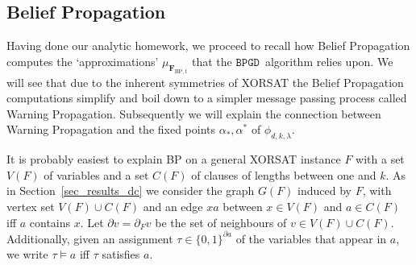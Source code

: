 \documentclass[10pt,reqno]{amsart}
\numberwithin{equation}{section}
\renewcommand{\vec}[1]{\boldsymbol{#1}}
\newcommand{\FBP}[1]{\PHI_{\mathrm{BP},{#1}}}
\newcommand{\BPGD}{\ensuremath{\mathtt{BPGD}}}
\newcommand\PHI{\vec F}
\newcommand\Sec{Section}
\newcommand{\ph}{\phi_{d,k,\lambda}}
\begin{document}
\subsection{Belief Propagation}\label{sec_bp}
Having done our analytic homework, we proceed to
recall how Belief Propagation computes the `approximations' $\mu_{\FBP{t}}$ that the \BPGD\ algorithm relies upon.
We will see that due to the inherent symmetries of XORSAT the Belief Propagation computations simplify and boil down to a simpler message passing process called Warning Propagation.
Subsequently we will explain the connection between Warning Propagation and the fixed points $\alpha_*,\alpha^*$ of $\ph$.

It is probably easiest to explain BP on a general XORSAT instance $F$ with a set $V(F)$ of variables and a set $C(F)$ of clauses of lengths between one and $k$.
As in \Sec~\ref{sec_results_dc} we consider the graph $G(F)$ induced by $F$, with vertex set $V(F)\cup  C(F)$ and an edge $xa$ between $x\in V(F)$ and $a\in C(F)$ iff $a$ contains $x$.
Let $\partial v=\partial_Fv$ be the set of neighbours of $v\in V(F)\cup C(F)$.
Additionally, given an assignment $\tau\in\{0,1\}^{\partial a}$ of the variables that appear in $a$, we write $\tau\models a$ iff $\tau$ satisfies $a$.
\end{document}
